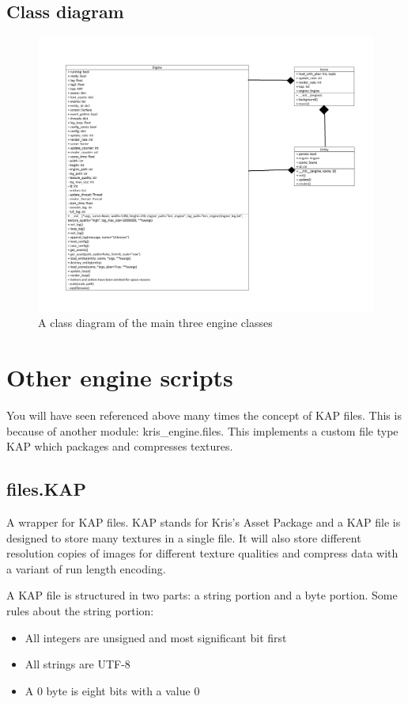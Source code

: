 \documentclass{report}
\begin{document}
\subsection{Class diagram}

\begin{figure}[ht]
\centering
\includegraphics[width=1\textwidth]{Class diagrams-1.png}
\caption{\label{fig:class1}A class diagram of the main three engine classes}
\end{figure}

\section{Other engine scripts}

You will have seen referenced above many times the concept of KAP files. This is because of another module: kris\_engine.files. This implements a custom file type KAP which packages and compresses textures.

\subsection{files.KAP}

A wrapper for KAP files. KAP stands for Kris's Asset Package and a KAP file is designed to store many textures in a single file. It will also store different resolution copies of images for different texture qualities and compress data with a variant of run length encoding.

A KAP file is structured in two parts: a string portion and a byte portion. Some rules about the string portion:
\begin{itemize}
\item All integers are unsigned and most significant bit first
\item All strings are UTF-8
\item A 0 byte is eight bits with a value 0
\end{itemize}
\end{document}
